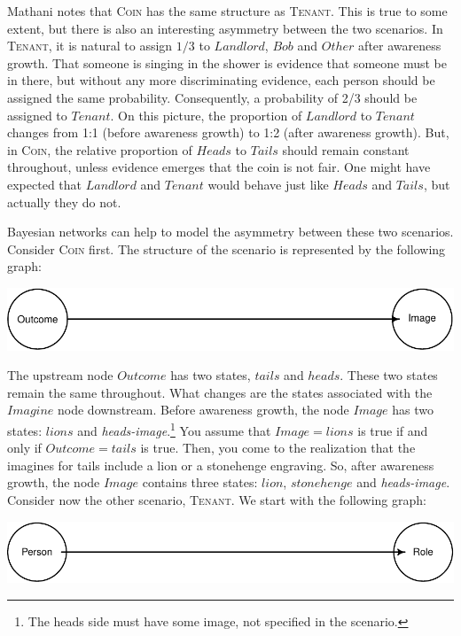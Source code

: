 \documentclass[
  11pt,
  dvipsnames,enabledeprecatedfontcommands]{scrartcl}
\begin{document}
Mathani notes that \textsc{Coin} has the same structure as
\textsc{Tenant}. This is true to some extent, but there is also an
interesting asymmetry between the two scenarios. In \textsc{Tenant}, it
is natural to assign \(1/3\) to \(Landlord\), \(Bob\) and \(Other\)
after awareness growth. That someone is singing in the shower is
evidence that someone must be in there, but without any more
discriminating evidence, each person should be assigned the same
probability. Consequently, a probability of 2/3 should be assigned to
\(Tenant\). On this picture, the proportion of \(Landlord\) to
\(Tenant\) changes from 1:1 (before awareness growth) to 1:2 (after
awareness growth). But, in \textsc{Coin}, the relative proportion of
\(Heads\) to \(Tails\) should remain constant throughout, unless
evidence emerges that the coin is not fair. One might have expected that
\(Landlord\) and \(Tenant\) would behave just like \(Heads\) and
\(Tails\), but actually they do not.

Bayesian networks can help to model the asymmetry between these two
scenarios. Consider \textsc{Coin} first. The structure of the scenario
is represented by the following graph:

\begin{center}\includegraphics[width=0.5\linewidth,height=0.3\textheight]{ReplyToSteeleStefansson5_files/figure-latex/tailsDAG-1} \end{center}

\noindent The upstream node \(Outcome\) has two states, \(tails\) and
\(heads\). These two states remain the same throughout. What changes are
the states associated with the \(Imagine\) node downstream. Before
awareness growth, the node \(Image\) has two states: \(lions\) and
\textit{heads-image}.\footnote{The heads side must have some image, not
  specified in the scenario.} You assume that \(Image=lions\) is true if
and only if \(Outcome=tails\) is true. Then, you come to the realization
that the imagines for tails include a lion or a stonehenge engraving.
So, after awareness growth, the node \(Image\) contains three states:
\(lion\), \(stonehenge\) and \textit{heads-image}. Consider now the
other scenario, \textsc{Tenant}. We start with the following graph:

\begin{center}\includegraphics[width=0.5\linewidth,height=0.3\textheight]{ReplyToSteeleStefansson5_files/figure-latex/tenantsDAG-1} \end{center}
\end{document}
